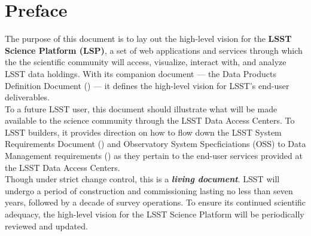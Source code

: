 \maketitle

\section{Preface\label{sec:preface}}

The purpose of this document is to lay out the high-level vision for the \textbf{LSST Science Platform (LSP)}, a set of web applications and services through which the the scientific community will access, visualize, interact with, and analyze LSST data holdings.
With its companion document --- the Data Products Definition Document (\DPDD) --- it defines the high-level vision for LSST's end-user deliverables.
\\

To a future LSST user, this document should illustrate what will be made available to the science community through the LSST Data Access Centers.
To LSST builders, it provides direction on how to flow down the LSST System Requirements Document (\LSR) and Observatory System Specficiations (OSS) to Data Management requirements (\DMSR) as they pertain to the end-user services provided at the LSST Data Access Centers.
\\

Though under strict change control, this is a \textbf\emph{living document}.
LSST will undergo a period of construction and commissioning lasting no less than seven years, followed by a decade of survey operations.
To ensure its continued scientific adequacy, the high-level vision for the LSST Science Platform will be periodically reviewed and updated.
